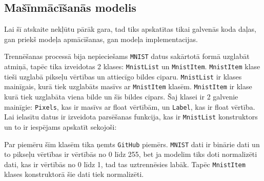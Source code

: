 \subsection{Mašīnmācīšanās modelis}

    Lai šī atskaite nekļūtu pārāk gara, tad tiks apskatītas tikai galvenās koda daļas, gan priekš
    modeļa apmācīšanas, gan modeļa implementacijas.

    Trennēšanas processā bija nepieciešams \texttt{MNIST} datus sakārtotā formā uzglabāt atmiņā, tapēc
    tika izveidotas 2 klases: \texttt{MnistList} un \texttt{MnistItem}. \texttt{MnistItem} klase tieši
    uzglabā pikseļu vērtības un attiecīgo bildes ciparu. \texttt{MnistList} ir klases mainīgais, kurā
    tiek uzglabāts masīvs ar \texttt{MnistItem} klasēm. \texttt{MnistItem} ir klase kurā tiek uzglabāta
    viena bilde un šīs bildes cipars. Šaj klasei ir 2 galvenie mainīgie: \texttt{Pixels}, kas ir masīvs
    ar float vērtībām, un \texttt{Label}, kas ir float vērtība. Lai ielasītu datus ir izveidota parsēšanas
    funkcija, kas ir \texttt{MnistList} konstruktors un to ir iespējams apskatīt sekojoši:

    

    Par piemēru šīm klasēm tika ņemts \texttt{GitHub} piemērs. \cite{paxbunPaxbunCntkMnistPractice2019}
    \texttt{MNIST} dati ir binārie dati un to pikseļu vērtības ir vērtībās no 0 līdz 255,
    bet ja modelim tiks doti normalizēti dati, kas ir vērtībās no 0 līdz 1, tad tas
    uztrennēsies labāk. Tapēc \texttt{MnistItem} klases konstruktorā šie dati tiek
    normalizēti.

    
